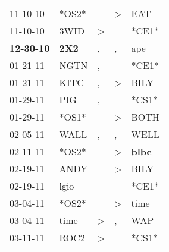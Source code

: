 \begin{supertabular}{p{0.07\textwidth}p{0.06\textwidth}p{0.02\textwidth}p{0.02\textwidth}p{0.06\textwidth}}
          11-10-10\textsuperscript{} &                            *OS2* &                  &     \textgreater &            EAT\textsuperscript{} \\
          11-10-10\textsuperscript{} &           3WID\textsuperscript{} &     \textgreater &                  &                            *CE1* \\
 \textbf{12-30-10\textsuperscript{}} &   \textbf{2X2\textsuperscript{}} &                , &                , &            ape\textsuperscript{} \\
          01-21-11\textsuperscript{} &           NGTN\textsuperscript{} &                , &                  &                            *CE1* \\
          01-21-11\textsuperscript{} &           KITC\textsuperscript{} &                , &     \textgreater &           BILY\textsuperscript{} \\
          01-29-11\textsuperscript{} &            PIG\textsuperscript{} &                , &                  &                            *CS1* \\
          01-29-11\textsuperscript{} &                            *OS1* &                  &     \textgreater &           BOTH\textsuperscript{} \\
          02-05-11\textsuperscript{} &           WALL\textsuperscript{} &                , &                , &           WELL\textsuperscript{} \\
          02-11-11\textsuperscript{} &                            *OS2* &                  &     \textgreater &  \textbf{blbc\textsuperscript{}} \\
          02-19-11\textsuperscript{} &           ANDY\textsuperscript{} &                  &     \textgreater &           BILY\textsuperscript{} \\
          02-19-11\textsuperscript{} &           lgio\textsuperscript{} &                  &                  &                            *CE1* \\
          03-04-11\textsuperscript{} &                            *OS2* &                  &     \textgreater &           time\textsuperscript{} \\
          03-04-11\textsuperscript{} &           time\textsuperscript{} &     \textgreater &                , &            WAP\textsuperscript{} \\
          03-11-11\textsuperscript{} &           ROC2\textsuperscript{} &     \textgreater &                  &                            *CS1* \\

\end{supertabular}
